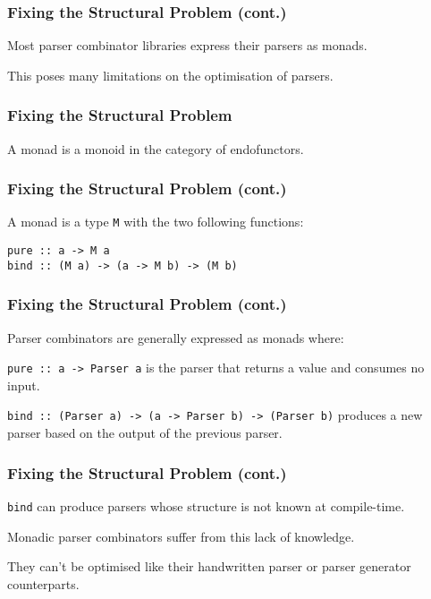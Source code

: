\documentclass{slides}
\begin{document}
\begin{frame}
\frametitle{Fixing the Structural Problem (cont.)}

Most parser combinator libraries express their parsers as monads.

This poses many limitations on the optimisation of parsers.

\end{frame}

\begin{frame}
\frametitle{Fixing the Structural Problem}

A monad is a monoid in the category of endofunctors.

\end{frame}

\begin{frame}[fragile]
\frametitle{Fixing the Structural Problem (cont.)}

A monad is a type \texttt{M} with the two following functions:

\begin{verbatim}
pure :: a -> M a
bind :: (M a) -> (a -> M b) -> (M b)
\end{verbatim}

\end{frame}

\begin{frame}[fragile]
\frametitle{Fixing the Structural Problem (cont.)}

Parser combinators are generally expressed as monads where:

\texttt{pure :: a -> Parser a} is the parser that returns a value and consumes no input.

\texttt{bind :: (Parser a) -> (a -> Parser b) -> (Parser b)} produces a new parser based on the output of the previous parser.

\end{frame}

\begin{frame}[fragile]
\frametitle{Fixing the Structural Problem (cont.)}

\texttt{bind} can produce parsers whose structure is not known at compile-time.

Monadic parser combinators suffer from this lack of knowledge. 

They can't be optimised like their handwritten parser or parser generator counterparts. 

\end{frame}
\end{document}
